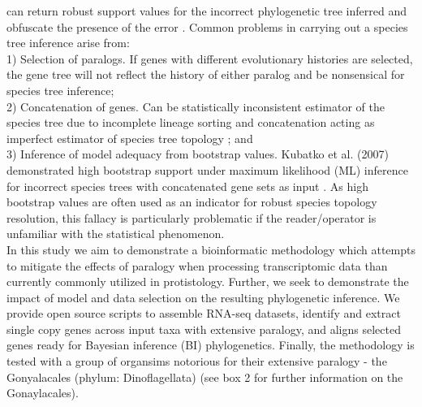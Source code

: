 \documentclass[12pt]{article}
\begin{document}
 can return robust support values for the incorrect phylogenetic tree inferred and obfuscate the presence of the error \cite{jeffroy2006phylogenomics,roch2015likelihood,kubatko2007inconsistency}. 
Common problems in carrying out a species tree inference arise from:\\
1) Selection of paralogs. 
If genes with different evolutionary histories are selected, the gene tree will not reflect the history of either paralog and be nonsensical for species tree inference; \\
2) Concatenation of genes. 
Can be statistically inconsistent estimator of the species tree due to incomplete lineage sorting and concatenation acting as imperfect estimator of species tree topology \cite{roch2015likelihood}; and \\
3) Inference of model adequacy from bootstrap values. 
Kubatko et al. (2007) demonstrated high bootstrap support under maximum likelihood (ML) inference for incorrect species trees with concatenated gene sets as input \cite{kubatko2007inconsistency}. 
As high bootstrap values are often used as an indicator for robust species topology resolution, this fallacy is particularly problematic if the reader/operator is unfamiliar with the statistical phenomenon.\\
In this study we aim to demonstrate a bioinformatic methodology which attempts to mitigate the effects of paralogy when processing transcriptomic data than currently commonly utilized in protistology. 
Further, we seek to demonstrate the impact of model and data selection on the resulting phylogenetic inference. 
We provide open source scripts to assemble RNA-seq datasets, identify and extract single copy genes across input taxa with extensive paralogy, and aligns selected genes ready for Bayesian inference (BI) phylogenetics. 
Finally, the methodology is tested with a group of organsims notorious for their extensive paralogy - the Gonyalacales (phylum: Dinoflagellata) (see box 2 for further information on the Gonaylacales).
\end{document}
